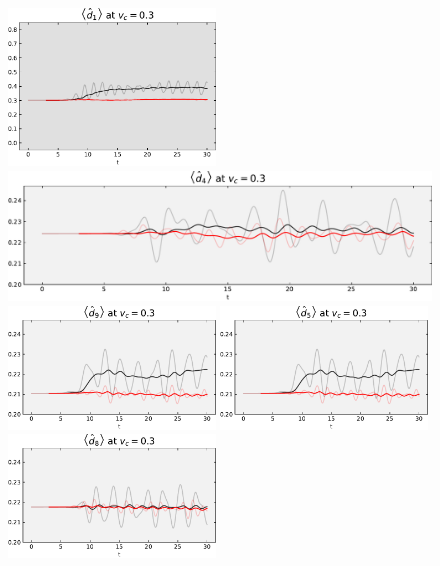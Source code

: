 \begin{figure}[!hbt]
\begin{minipage}[b]{.49\textwidth}
                \includegraphics[width=0.49\textwidth]{graph/double_occupation/double_occupation_vc_03_site_1.pdf}
                \includegraphics[width=1.00\textwidth]{graph/double_occupation/double_occupation_vc_03_site_4.pdf}
                \includegraphics[width=0.49\textwidth]{graph/double_occupation/double_occupation_vc_03_site_9.pdf}
                \includegraphics[width=0.49\textwidth]{graph/double_occupation/double_occupation_vc_03_site_5.pdf}
                \includegraphics[width=0.49\textwidth]{graph/double_occupation/double_occupation_vc_03_site_8.pdf}

\end{minipage}
\end{figure}
